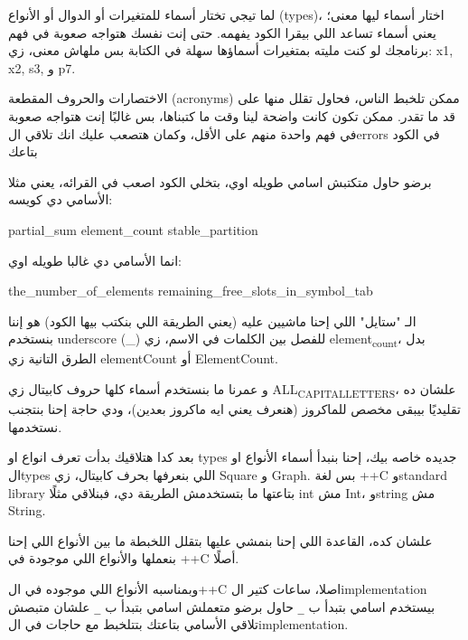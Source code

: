 \documentclass[11pt]{article}
\let\OriginalVerbatim\verbatim
\let\endOriginalVerbatim\endverbatim
\renewenvironment{verbatim}{\begin{english}\OriginalVerbatim}{\endOriginalVerbatim\end{english}}
\begin{document}
لما تيجي تختار أسماء للمتغيرات أو الدوال أو الأنواع (types)، اختار أسماء ليها معنى؛ يعني أسماء تساعد اللي بيقرا الكود يفهمه. حتى إنت نفسك هتواجه صعوبة في فهم برنامجك لو كنت مليته بمتغيرات أسماؤها سهلة في الكتابة بس ملهاش معنى، زي: x1, x2, s3, و p7.

الاختصارات والحروف المقطعة (acronyms) ممكن تلخبط الناس، فحاول تقلل منها على قد ما تقدر. ممكن تكون كانت واضحة لينا وقت ما كتبناها، بس غالبًا إنت هتواجه صعوبة في فهم واحدة منهم على الأقل، وكمان هتصعب عليك انك تلاقي الerrors في الكود بتاعك

برضو حاول متكتبش اسامي طويله اوي، بتخلي الكود اصعب في القرائه، يعني مثلا الأسامي دي كويسه:

\begin{verbatim}
partial_sum
element_count
stable_partition
\end{verbatim}

انما الأسامي دي غالبا طويله اوي:

\begin{verbatim}
the_number_of_elements
remaining_free_slots_in_symbol_tab
\end{verbatim}

الـ "ستايل" اللي إحنا ماشيين عليه (يعني الطريقة اللي بنكتب بيها الكود) هو إننا بنستخدم underscore (\_) للفصل بين الكلمات في الاسم، زي element\textsubscript{count}، بدل الطرق التانية زي elementCount أو ElementCount.

و عمرنا ما بنستخدم أسماء كلها حروف كابيتال زي ALL\textsubscript{CAPITAL}\textsubscript{LETTERS}، علشان ده تقليديًا بيبقى مخصص للماكروز (هنعرف يعني ايه ماكروز بعدين)، ودي حاجة إحنا بنتجنب نستخدمها.

بعد كدا هتلاقيك بدأت تعرف انواع او types جديده خاصه بيك، إحنا بنبدأ أسماء الأنواع او الtypes اللي بنعرفها بحرف كابيتال، زي Square و Graph.
بس لغة ++C وstandard library بتاعتها ما بتستخدمش الطريقة دي، فبنلاقي مثلًا int مش Int، وstring مش String.

علشان كده، القاعدة اللي إحنا بنمشي عليها بتقلل اللخبطة ما بين الأنواع اللي إحنا بنعملها والأنواع اللي موجودة في ++C أصلًا.

وبمناسبه الأنواع اللي موجوده في ال++C اصلا، ساعات كتير الimplementation بيستخدم اسامي بتبدأ ب \texttt{\_} حاول برضو متعملش اسامي بتبدأ ب \texttt{\_} علشان متبصش تلاقي الأسامي بتاعتك بتتلخبط مع حاجات في الimplementation.
\end{document}
